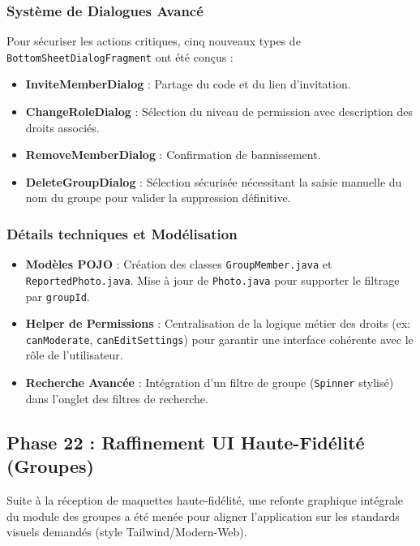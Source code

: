 \documentclass{article}
\begin{document}
\subsubsection{Système de Dialogues Avancé}
Pour sécuriser les actions critiques, cinq nouveaux types de \texttt{BottomSheetDialogFragment} ont été conçus :
\begin{itemize}
    \item \textbf{InviteMemberDialog} : Partage du code et du lien d'invitation.
    \item \textbf{ChangeRoleDialog} : Sélection du niveau de permission avec description des droits associés.
    \item \textbf{RemoveMemberDialog} : Confirmation de bannissement.
    \item \textbf{DeleteGroupDialog} : Sélection sécurisée nécessitant la saisie manuelle du nom du groupe pour valider la suppression définitive.
\end{itemize}

\subsubsection{Détails techniques et Modélisation}
\begin{itemize}
    \item \textbf{Modèles POJO} : Création des classes \texttt{GroupMember.java} et \texttt{ReportedPhoto.java}. Mise à jour de \texttt{Photo.java} pour supporter le filtrage par \texttt{groupId}.
    \item \textbf{Helper de Permissions} : Centralisation de la logique métier des droits (ex: \texttt{canModerate}, \texttt{canEditSettings}) pour garantir une interface cohérente avec le rôle de l'utilisateur.
    \item \textbf{Recherche Avancée} : Intégration d'un filtre de groupe (\texttt{Spinner} stylisé) dans l'onglet des filtres de recherche.
\end{itemize}

\subsection{Phase 22 : Raffinement UI Haute-Fidélité (Groupes)}
Suite à la réception de maquettes haute-fidélité, une refonte graphique intégrale du module des groupes a été menée pour aligner l'application sur les standards visuels demandés (style Tailwind/Modern-Web).
\end{document}
